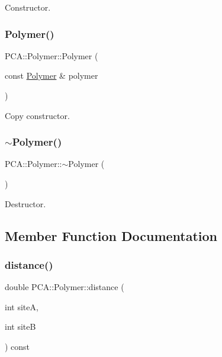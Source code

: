 Constructor. 

\hypertarget{class_p_c_a_1_1_polymer_a1ce99540db06e9e48392423ba516cd2f}{}\label{class_p_c_a_1_1_polymer_a1ce99540db06e9e48392423ba516cd2f} 
\subsubsection{\texorpdfstring{Polymer()}{Polymer()}\hspace{0.1cm}{\footnotesize\ttfamily [4/4]}}
{\footnotesize\ttfamily P\+C\+A\+::\+Polymer\+::\+Polymer (\begin{DoxyParamCaption}\item[{const \hyperlink{class_p_c_a_1_1_polymer}{Polymer} \&}]{polymer }\end{DoxyParamCaption})}



Copy constructor. 

\hypertarget{class_p_c_a_1_1_polymer_ac0d31fa5c6bee720f8069805d6669606}{}\label{class_p_c_a_1_1_polymer_ac0d31fa5c6bee720f8069805d6669606} 
\subsubsection{\texorpdfstring{$\sim$\+Polymer()}{~Polymer()}}
{\footnotesize\ttfamily P\+C\+A\+::\+Polymer\+::$\sim$\+Polymer (\begin{DoxyParamCaption}{ }\end{DoxyParamCaption})}



Destructor. 



\subsection{Member Function Documentation}
\hypertarget{class_p_c_a_1_1_polymer_a901d8c030d3edb333498edcc4502b27a}{}\label{class_p_c_a_1_1_polymer_a901d8c030d3edb333498edcc4502b27a} 
\subsubsection{\texorpdfstring{distance()}{distance()}}
{\footnotesize\ttfamily double P\+C\+A\+::\+Polymer\+::distance (\begin{DoxyParamCaption}\item[{int}]{siteA,  }\item[{int}]{siteB }\end{DoxyParamCaption}) const}

